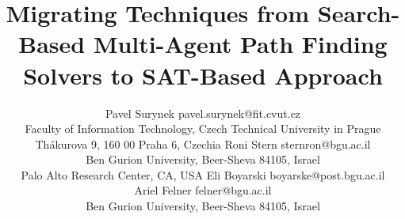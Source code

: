 \documentclass[jair,oneside,11pt]{article}
\begin{document}
\title{Migrating Techniques from Search-Based Multi-Agent Path Finding Solvers to SAT-Based Approach}

\author{\name Pavel Surynek \email pavel.surynek@fit.cvut.cz \\
       \addr Faculty of Information Technology, Czech Technical University in Prague \\
       Th\'{a}kurova 9, 160 00 Praha 6, Czechia
       \AND
       \name Roni Stern \email sternron@bgu.ac.il \\
       \addr Ben Gurion University, Beer-Sheva 84105, Israel \\
       Palo Alto Research Center, CA, USA
       \AND
       \name Eli Boyarski \email boyarske@post.bgu.ac.il \\
       \name Ariel Felner \email felner@bgu.ac.il \\
       \addr Ben Gurion University, Beer-Sheva 84105, Israel}








\maketitle
\end{document}
